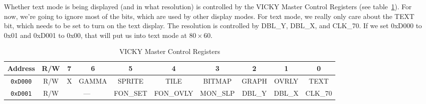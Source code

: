 Whether text mode is being displayed (and in what resolution) is controlled by the VICKY Master Control Registers (see table~\ref{tab:vky_master_ctrl_reg}). For now, we're going to ignore most of the bits, which are used by other display modes. For text mode, we really only care about the TEXT bit, which needs to be set to turn on the text display. The resolution is controlled by DBL\_Y, DBL\_X, and CLK\_70. If we set 0xD000 to 0x01 and 0xD001 to 0x00, that will put us into text mode at $80 \times 60$.

\begin{table}[ht]
    \begin{center}
        \begin{tabular}{|c|c|c|c|c|c|c|c|c|c|} \hline
            Address & R/W & 7 & 6 & 5 & 4 & 3 & 2 & 1 & 0 \\ \hline\hline
            \verb+0xD000+ & R/W & X & GAMMA & SPRITE & TILE & BITMAP & GRAPH & OVRLY & TEXT \\ \hline
            \verb+0xD001+ & R/W & \multicolumn{2}{|c|}{---} & FON\_SET & FON\_OVLY & MON\_SLP & DBL\_Y & DBL\_X & CLK\_70 \\ \hline
        \end{tabular}
    \end{center}
    \caption{VICKY Master Control Registers}
    \label{tab:vky_master_ctrl_reg}
\end{table}

